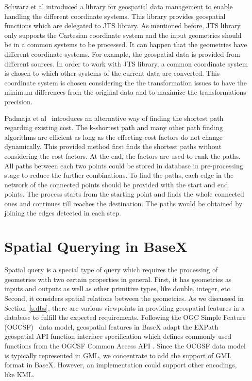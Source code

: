 \documentclass[a4paper,12pt]{article}
\begin{document}
Schwarz et al\cite{Schwarz2004} introduced a library for geospatial data management to enable handling the different coordinate systems. This library provides geospatial functions which are delegated to JTS library. As mentioned before, JTS library only supports the Cartesian coordinate system and the input geometries should be in a common systems to be processed. It can happen that the geometries have different coordinate systems. For example, the geospatial data is provided from different sources. In order to work with JTS library, a common coordinate system is chosen to which other systems of the current data are converted. This coordinate system is chosen considering the the transformation issues to have the minimum differences from the original data and to maximize the transformations precision.


Padmaja et al~\cite{short-path} introduces an alternative way of finding the shortest path regarding existing cost. The k-shortest path and many other path finding algorithms are efficient as long as the effecting cost factors do not change dynamically. This provided method first finds the shortest paths without considering the cost factors. At the end, the factors are used to rank the paths. All paths between each two points could be stored in database in pre-processing stage to reduce the further combinations. To find the paths, each edge in the network of the connected points should be provided with the start and end points. The process starts from the starting point and finds the whole connected ones and continues till reaches the destination. The paths would be obtained by joining the edges detected in each step.
















\newpage
\section{Spatial Querying in BaseX}
\label{s.basex}
Spatial query is a special type of query which requires the processing of geometries with two certain properties in general. First, it has geometries as inputs and outputs as well as other primitive types, like double, integer, etc. Second, it considers spatial relations between the geometries.
As we discussed in Section~\ref{s.dbs}, there are various viewpoints in providing geospatial features in a database to fulfill the expected requirements. Following the OGC Simple Feature (OGCSF)~\cite{springergeo} data model, geospatial features in BaseX adapt the EXPath geospatial API function interface specification which defines commonly used functions from the OGCSF Common Access API \cite{simpleFeature}. Since the OCGSF data model is typically represented in GML, we concentrate to add the support of GML format in BaseX. However, an implementation could support other encodings, like KML. 
\end{document}
